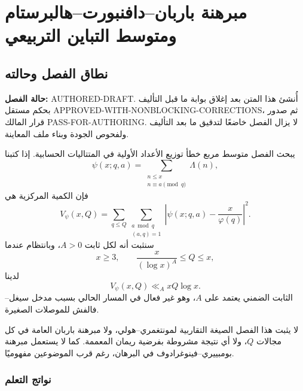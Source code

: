 \chapter{مبرهنة باربان--دافنبورت--هالبرستام ومتوسط التباين التربيعي}

\section{نطاق الفصل وحالته}

\noindent\textbf{حالة الفصل:} \textenglish{AUTHORED-DRAFT}. أُنشئ هذا المتن بعد
إغلاق بوابة ما قبل التأليف بحكم مستقل
\textenglish{APPROVED-WITH-NONBLOCKING-CORRECTIONS}، ثم صدور قرار المالك
\textenglish{PASS-FOR-AUTHORING}. لا يزال الفصل خاضعًا لتدقيق ما بعد التأليف
ولفحوص الجودة وبناء ملف المعاينة.

يبحث الفصل متوسط مربع خطأ توزيع الأعداد الأولية في المتتاليات الحسابية. إذا
كتبنا
\[
\psi(x;q,a)=\sum_{\substack{n\le x\\n\equiv a\pmod q}}\Lambda(n),
\]
فإن الكمية المركزية هي
\[
V_\psi(x,Q)=
\sum_{q\le Q}
\sum_{\substack{a\bmod q\\(a,q)=1}}
\left|\psi(x;q,a)-\frac{x}{\varphi(q)}\right|^2.
\]
سنثبت أنه لكل ثابت \(A>0\)، وبانتظام عندما
\[
x\ge3,
\qquad
\frac{x}{(\log x)^A}\le Q\le x,
\]
لدينا
\[
V_\psi(x,Q)\ll_A xQ\log x.
\]
الثابت الضمني يعتمد على \(A\)، وهو غير فعال في المسار الحالي بسبب مدخل
سيغل--فالفش للموصلات الصغيرة.

لا يثبت هذا الفصل الصيغة التقاربية لمونتغمري--هولي، ولا مبرهنة باربان العامة
في كل مجالات \(Q\)، ولا أي نتيجة مشروطة بفرضية ريمان المعممة. كما لا يستعمل
مبرهنة بومبييري--فينوغرادوف في البرهان، رغم قرب الموضوعين مفهوميًا.

\subsection{نواتج التعلم}

